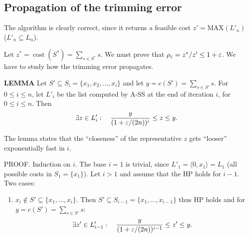 \subsection{Propagation of the trimming error}
The algorithm is clearly correct, since it returns a feasible cost $z'=\mathrm{MAX}(L'_n)$ ($L'_n\subseteq L_n$).

Let $z^*=\operatorname{cost}(S^*)=\sum_{s\in S^*}s$. We must prove that $\rho_\varepsilon=z^*/z'\leq1+\varepsilon$.
We have to study how the trimming error propagates.
\begin{notesresult}
\textbf{LEMMA} Let $S'\subseteq S_i=\{x_1,x_2,\ldots,x_i\}$ and let $y=c(S')=\sum_{s\in S'}s$.
For $0\leq i\leq n$, let $L'_i$ be the list computed by A-SS at the end of iteration $i$, for $0\leq i\leq n$. Then
\[\exists z\in L'_i:\quad\frac y{(1+\varepsilon/(2n))^i}\leq z\leq y.\]
\end{notesresult}
The lemma states that the ``closeness'' of the representative $z$ gets ``looser'' exponentially fast in $i$.

PROOF. Induction on $i$. The base $i=1$ is trivial, since $L'_1=\langle0,x_1\rangle=L_1$ (all possible costs in $S_1=\{x_1\}$). Let $i>1$ and assume that the HP holds for $i-1$. Two cases:
\begin{enumerate}
\item $x_i\notin S'\subseteq\{x_1,\ldots,x_i\}$. Then $S'\subseteq S_{i-1}=\{x_1,\ldots,x_{i-1}\}$ thus HP holds and for $y=c(S')=\sum_{s\in S'}s$:
\[\exists z'\in L'_{i-1}:\quad\frac y{(1+\varepsilon/(2n))^{i-1}}\leq z'\leq y.\]
\end{enumerate}
